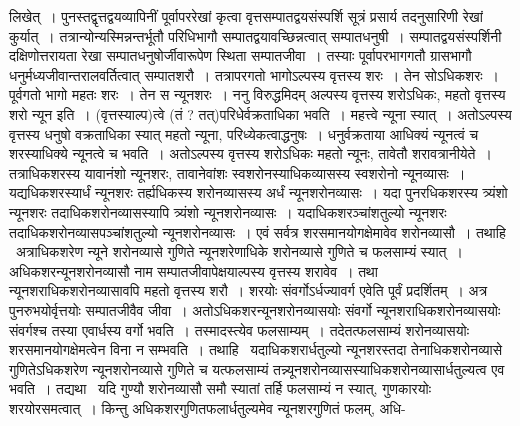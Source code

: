 \documentclass[11pt, openany]{book}
\begin{document}
\noindent लिखेत्~। पुनस्तद्वृत्तद्वयव्यापिनीं पूर्वापररेखां कृत्वा वृत्तसम्पातद्वयसंस्पर्शि सूत्रं प्रसार्य तदनुसारिणी रेखां कुर्यात्~। तत्रान्योन्यस्मिन्नन्तर्भूतौ परिधिभागौ सम्पातद्वयावच्छिन्नत्वात् सम्पातधनुषी~। सम्पातद्वयसंस्पर्शिनी दक्षिणोत्तरायता रेखा सम्पातधनुषोर्जीवारूपेण स्थिता सम्पातजीवा~। तस्याः पूर्वापरभागगतौ ग्रासभागौ धनुर्मध्यजीवान्तरालवर्तित्वात् सम्पातशरौ~। तत्रापरगतो भागोऽल्पस्य वृत्तस्य शरः~। तेन सोऽधिकशरः~। पूर्वगतो भागो महतः शरः~। तेन स न्यूनशरः~। ननु विरुद्धमिदम् अल्पस्य वृत्तस्य शरोऽधिकः, महतो वृत्तस्य शरो न्यून इति~। (वृत्तस्याल्प)त्वे (तं ? तत्)परिधेर्वक्रताधिका भवति~। महत्त्वे न्यूना स्यात्~। अतोऽल्पस्य वृत्तस्य धनुषो वक्रताधिका स्यात् महतो न्यूना, परिध्येकत्वाद्धनुषः~। धनुर्वक्रताया आधिक्यं न्यूनत्वं च शरस्याधिक्ये न्यूनत्वे च भवति~। अतोऽल्पस्य वृत्तस्य शरोऽधिकः महतो न्यूनः, तावेतौ शरावत्रानीयेते~। तत्राधिकशरस्य यावानंशो न्यूनशरः, तावानेवांशः स्वशरोनस्याधिकव्यासस्य स्वशरोनो न्यूनव्यासः~। यद्यधिकशरस्यार्धं न्यूनशरः तर्ह्यधिकस्य शरोनव्यासस्य अर्धं न्यूनशरोनव्यासः~। यदा पुनरधिकशरस्य त्र्यंशो न्यूनशरः तदाधिकशरोनव्यासस्यापि त्र्यंशो न्यूनशरोनव्यासः~। यदाधिकशरञ्चांशतुल्यो न्यूनशरः तदाधिकशरोनव्यासपञ्चांशतुल्यो न्यूनशरोनव्यासः~। एवं सर्वत्र शरसमानयोगक्षेमावेव शरोनव्यासौ~। तथाहि \textendash\ अत्राधिकशरेण न्यूने शरोनव्यासे गुणिते न्यूनशरेणाधिके शरोनव्यासे गुणिते च फलसाम्यं स्यात्~। अधिकशरन्यूनशरोनव्यासौ नाम सम्पातजीवापेक्षयाल्पस्य वृत्तस्य शरावेव~। तथा न्यूनशराधिकशरोनव्यासावपि महतो वृत्तस्य शरौ~। शरयोः संवर्गोऽर्धज्यावर्ग एवेति पूर्वं प्रदर्शितम्~। अत्र पुनरुभयोर्वृत्तयोः सम्पातजीवैव जीवा~। अतोऽधिकशरन्यूनशरोनव्यासयोः संवर्गो न्यूनशराधिकशरोनव्यासयोः संवर्गश्च तस्या एवार्धस्य वर्गो भवति~। तस्मादस्त्येव फलसाम्यम्~। तदेतत्फलसाम्यं शरोनव्यासयोः शरसमानयोगक्षेमत्वेन विना न सम्भवति~। तथाहि \textendash\ यदाधिकशरार्धतुल्यो न्यूनशरस्तदा तेनाधिकशरोनव्यासे गुणितेऽधिकशरेण न्यूनशरोनव्यासे गुणिते च यत्फलसाम्यं तन्न्यूनशरोनव्यासस्याधिकशरोनव्यासार्धतुल्यत्व एव भवति~। तद्यथा \textendash\ यदि गुण्यौ शरोनव्यासौ समौ स्यातां तर्हि फलसाम्यं न स्यात्, गुणकारयोः शरयोरसमत्वात्~। किन्तु अधिकशरगुणितफलार्धतुल्यमेव न्यूनशरगुणितं फलम्, अधि-

\newpage
\end{document}
